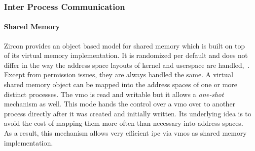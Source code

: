 \subsubsection*{Inter Process Communication}
\paragraph{Shared Memory}
Zircon provides an object based model for shared memory which is built on top of its virtual memory implementation.
It is randomized per default and does not differ in the way the address space layouts of kernel and userspace are handled\cite{zircon-vmo},~\cite{zircon-concepts}.
Except from permission issues, they are always handled the same\cite{zircon-vmar}.
A virtual shared memory object can be mapped into the address spaces of one or more distinct processes.
The \acf{vmo} is read and writable but it allows a \textit{one-shot} mechanism as well.
This mode hands the control over a \ac{vmo} over to another process directly after it was created and initially written\cite{zircon-concepts}.
Its underlying idea is to avoid the cost of mapping them more often than necessary into address spaces.
As a result, this mechanism allows very efficient \ac{ipc} via \acp{vmo} as shared memory implementation\cite{zircon-concepts}.

